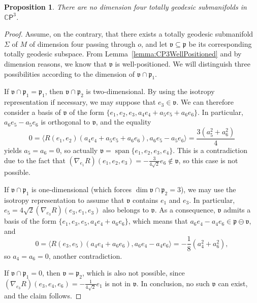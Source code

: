 \documentclass[11pt,a4paper,final]{amsart}
\newcommand{\g}{\mathfrak}
\newcommand{\C}{\mathbb{C}}
\newcommand{\vecspan}{\operatorname{span}}
\newtheorem{proposition}[theorem]{Proposition}
\theoremstyle{definition}
\begin{document}
\begin{proposition}
	\label{prop:4tgcp3}
	There are no dimension four totally geodesic submanifolds in $\C\mathsf{P}^{3}$.
\end{proposition}
\begin{proof}
	Assume, on the contrary, that there exists a totally geodesic submanifold $\Sigma$ of $M$ of dimension four passing through $o$, and let $\g{v}\subseteq \g{p}$ be its corresponding totally geodesic subspace.
	From Lemma~\ref{lemma:CP3WellPositioned} and by dimension reasons, we know that $\g{v}$ is well-positioned.
	We will distinguish three possibilities according to the dimension of $\g{v}\cap \g{p}_{1}$.
		
	If $\g{v}\cap \g{p}_{1}=\g{p}_{1}$, then $\g{v}\cap\g{p}_{2}$ is two-dimensional.
	By using the isotropy representation if necessary, we may suppose that $e_{3}\in \g{v}$.
	We can therefore consider a basis of $\g{v}$ of the form $\{e_{1},e_{2},e_{3},a_{4}e_{4}+a_{5}e_{5}+a_{6}e_{6}\}$.
	In particular, $a_{6}e_{5}-a_{5}e_{6}$ is orthogonal to $\g{v}$, and the equality
	\[
		0=\langle R(e_{1},e_{2})(a_{4}e_{4}+a_{5}e_{5}+a_{6}e_{6}),a_{6}e_{5}-a_{5}e_{6} \rangle=\frac{3(a_{5}^{2}+a_{6}^{2})}{4}
	\]
	yields $a_{5}=a_{6}=0$, so actually $\g{v}=\vecspan\{e_{1},e_{2},e_{3},e_{4}\}$.
	This is a contradiction due to the fact that $(\nabla_{e_{1}}R)(e_{1},e_{2},e_{3})=-\frac{3}{4\sqrt{2}}e_{6}\notin \g{v}$,
	so this case is not possible.
		
	If $\g{v}\cap \g{p}_{1}$ is one-dimensional (which forces $\dim \g{v}\cap\g{p}_{2}=3$), we may use the isotropy representation to assume that $\g{v}$ contains $e_{1}$ and $e_{3}$.
	In particular, $e_{5}=4\sqrt{2}(\nabla_{e_{3}}R)(e_{3},e_{1},e_{3})$ also belongs to $\g{v}$.
	As a consequence, $\g{v}$ admits a basis of the form $\{e_{1},e_{3},e_{5},a_{4}e_{4}+a_{6}e_{6}\}$, which means that $a_{6}e_{4}-a_{4}e_{6}\in \g{p}\ominus \g{v}$, and
	\[
		0=\langle R(e_{3},e_{5})(a_{4}e_{4}+a_{6}e_{6}), a_{6}e_{4}-a_{4}e_{6} \rangle=-\frac{1}{8}(a_{4}^{2}+a_{6}^{2}),
	\]
	so $a_{4}=a_{6}=0$, another contradiction.
		
	If $\g{v}\cap \g{p}_{1}=0$, then $\g{v}=\g{p}_{2}$, which is also not possible, since $(\nabla_{e_{3}}R)(e_{3},e_{4},e_{6})=-\frac{1}{4\sqrt{2}}e_{1}$ is not in $\g{v}$. In conclusion, no such $\g{v}$ can exist, and the claim follows.\qedhere
\end{proof}
	
\end{document}
